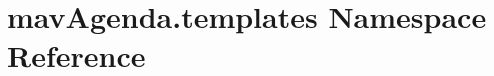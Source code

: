 \hypertarget{namespacemavAgenda_1_1templates}{}\section{mav\+Agenda.\+templates Namespace Reference}
\label{namespacemavAgenda_1_1templates}
